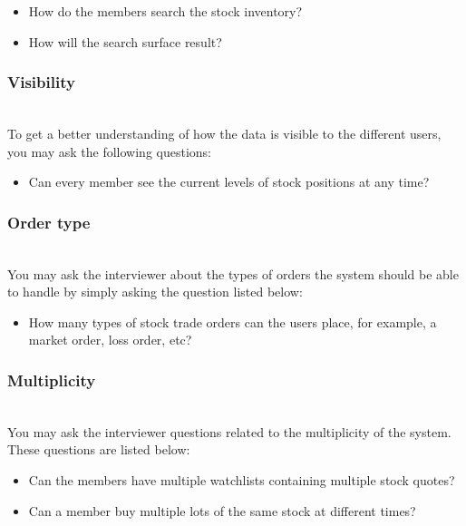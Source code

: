 \begin{itemize}
\item
\protect{}\label{8U3-KUlQSLnj94TEBU0vp}
How do the members search the stock inventory?
\item
\protect{}\label{LE82gxTZt4_7y_4Ou4gVh}
How will the search surface result?
\end{itemize}

\subsubsection{Visibility}\label{h0yykrFO5tS6Tl0PtLlY3}
\\
To get a better understanding of how the data is visible to the different users, you may ask the following questions:

\begin{itemize}
\item
\protect{}\label{VXqSXjI2reO6aR8EEP783}
Can every member see the current levels of stock positions at any time?
\end{itemize}

\subsubsection{Order type}\label{NV9FEg5EzfR6z5DY0IKgt}
\\
You may ask the interviewer about the types of orders the system should be able to handle by simply asking the question listed below:

\begin{itemize}
\item
\protect{}\label{g8EQ18cIzNXkbbdcNt9FL}
How many types of stock trade orders can the users place, for example, a market order, loss order, etc?
\end{itemize}

\subsubsection{Multiplicity}\label{mtTy2Q_Wy__Jr1NHohniL}
\\
You may ask the interviewer questions related to the multiplicity of the system. These questions are listed below:

\begin{itemize}
\item
\protect{}\label{NSbYz7wsqa-iA6GOteE2h}
Can the members have multiple watchlists containing multiple stock quotes?
\item
\protect{}\label{QeHuLTgHQTcOcnvsbzIcM}
Can a member buy multiple lots of the same stock at different times?
\end{itemize}

